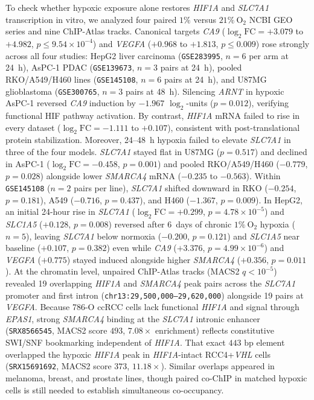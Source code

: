 \documentclass[10pt,twocolumn]{article}
\begin{document}
To check whether hypoxic exposure alone restores \textit{HIF1A} and \textit{SLC7A1} transcription in vitro, we analyzed four paired $1\%$ versus $21\%\ \text{O}_2$ NCBI GEO series and nine ChIP-Atlas tracks. Canonical targets \textit{CA9} ($\log_2\text{FC} = +3.079$ to $+4.982$, $p \le 9.54 \times 10^{-4}$) and \textit{VEGFA} ($+0.968$ to $+1.813$, $p \le 0.009$) rose strongly across all four studies: HepG2 liver carcinoma (\texttt{GSE283995}, $n = 6$ per arm at 24~h), AsPC-1 PDAC (\texttt{GSE139673}, $n = 3$ pairs at 24~h), pooled RKO/A549/H460 lines (\texttt{GSE145108}, $n = 6$ pairs at 24~h), and U87MG glioblastoma (\texttt{GSE300765}, $n = 3$ pairs at 48~h). Silencing \textit{ARNT} in hypoxic AsPC-1 reversed \textit{CA9} induction by $-1.967$ $\log_2$-units ($p = 0.012$), verifying functional HIF pathway activation. By contrast, \textit{HIF1A} mRNA failed to rise in every dataset ($\log_2\text{FC} = -1.111$ to $+0.107$), consistent with post-translational protein stabilization. Moreover, 24--48~h hypoxia failed to elevate \textit{SLC7A1} in three of the four models. \textit{SLC7A1} stayed flat in U87MG ($p = 0.517$) and declined in AsPC-1 ($\log_2\text{FC} = -0.458$, $p = 0.001$) and pooled RKO/A549/H460 ($-0.779$, $p = 0.028$) alongside lower \textit{SMARCA4} mRNA ($-0.235$ to $-0.563$). Within \texttt{GSE145108} ($n = 2$ pairs per line), \textit{SLC7A1} shifted downward in RKO ($-0.254$, $p = 0.181$), A549 ($-0.716$, $p = 0.437$), and H460 ($-1.367$, $p = 0.009$). In HepG2, an initial 24-hour rise in \textit{SLC7A1} ($\log_2\text{FC} = +0.299$, $p = 4.78 \times 10^{-5}$) and \textit{SLC1A5} ($+0.128$, $p = 0.008$) reversed after 6~days of chronic $1\%\ \text{O}_2$ hypoxia ($n = 5$), leaving \textit{SLC7A1} below normoxia ($-0.200$, $p = 0.121$) and \textit{SLC1A5} near baseline ($+0.107$, $p = 0.382$) even while \textit{CA9} ($+3.376$, $p = 4.99 \times 10^{-6}$) and \textit{VEGFA} ($+0.775$) stayed induced alongside higher \textit{SMARCA4} ($+0.356$, $p = 0.011$). At the chromatin level, unpaired ChIP-Atlas tracks (MACS2 $q < 10^{-5}$) revealed 19 overlapping \textit{HIF1A} and \textit{SMARCA4} peak pairs across the \textit{SLC7A1} promoter and first intron (\texttt{chr13:29,500,000--29,620,000}) alongside 19 pairs at \textit{VEGFA}. Because 786-O ccRCC cells lack functional \textit{HIF1A} and signal through \textit{EPAS1}, strong \textit{SMARCA4} binding at the \textit{SLC7A1} intronic enhancer (\texttt{SRX8566545}, MACS2 score $493$, $7.08\times$ enrichment) reflects constitutive SWI/SNF bookmarking independent of \textit{HIF1A}. That exact $443\text{ bp}$ element overlapped the hypoxic \textit{HIF1A} peak in \textit{HIF1A}-intact RCC4+\textit{VHL} cells (\texttt{SRX15691692}, MACS2 score $373$, $11.18\times$). Similar overlaps appeared in melanoma, breast, and prostate lines, though paired co-ChIP in matched hypoxic cells is still needed to establish simultaneous co-occupancy.
\end{document}

